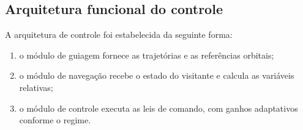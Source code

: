 \subsection{Arquitetura funcional do controle}

A arquitetura de controle foi estabelecida da seguinte forma:

\begin{enumerate}[label=(\roman*), leftmargin=*, itemsep=0pt]
    \item o módulo de guiagem fornece as trajetórias e as referências orbitais;
    \item o módulo de navegação recebe o estado do visitante e calcula as variáveis relativas;
    \item o módulo de controle executa as leis de comando, com ganhos adaptativos conforme o regime.
\end{enumerate}